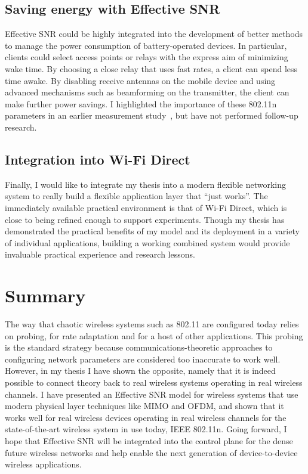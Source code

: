 \subsection{Saving energy with Effective SNR}
Effective SNR could be highly integrated into the development of better methods to manage the power consumption of battery-operated devices. In particular, clients could select access points or relays with the express aim of minimizing wake time. By choosing a close relay that uses fast rates, a client can spend less time awake. By disabling receive antennas on the mobile device and using advanced mechanisms such as beamforming on the transmitter, the client can make further power savings. I highlighted the importance of these 802.11n parameters in an earlier measurement study~\cite{Halperin_Power}, but have not performed follow-up research.

\subsection{Integration into Wi-Fi Direct}
Finally, I would like to integrate my thesis into a modern flexible networking system to really build a flexible application layer that ``just works''. The immediately available practical environment is that of Wi-Fi Direct, which is close to being refined enough to support experiments. Though my thesis has demonstrated the practical benefits of my model and its deployment in a variety of individual applications, building a working combined system would provide invaluable practical experience and research lessons.

\section{Summary}
The way that chaotic wireless systems such as 802.11 are configured today relies on probing, for rate adaptation and for a host of other applications. This probing is the standard strategy because communications-theoretic approaches to configuring network parameters are considered too inaccurate to work well. However, in my thesis I have shown the opposite, namely that it is indeed possible to connect theory back to real wireless systems operating in real wireless channels. I have presented an Effective SNR model for wireless systems that use modern physical layer techniques like MIMO and OFDM, and shown that it works well for real wireless devices operating in real wireless channels for the state-of-the-art wireless system in use today, IEEE 802.11n. Going forward, I hope that Effective SNR will be integrated into the control plane for the dense future wireless networks and help enable the next generation of device-to-device wireless applications.

\ifx\mainfile\undefined

\fi

